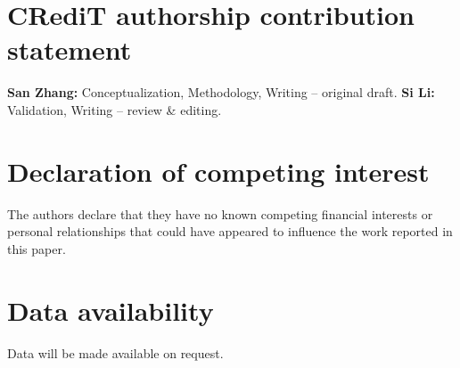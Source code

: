 \documentclass[preprint,review,12pt]{elsarticle}
\begin{document}
\newpage   %
\section*{CRediT authorship contribution statement}
\textbf{San Zhang:} Conceptualization, Methodology, Writing -- original draft.
\textbf{Si Li:} Validation, Writing -- review \& editing.

\section*{Declaration of competing interest}
The authors declare that they have no known competing financial interests or personal
relationships that could have appeared to influence the work reported in this paper.

\section*{Data availability}
Data will be made available on request.



\end{document}
